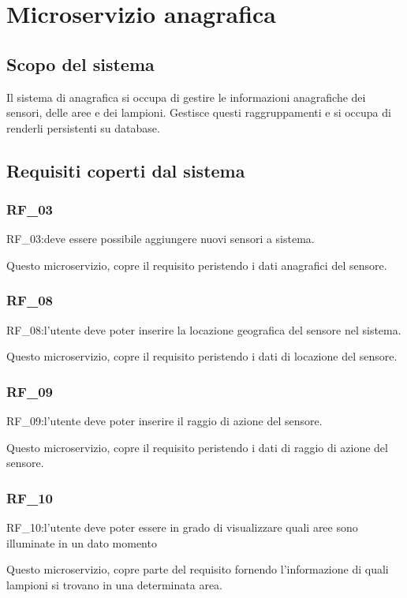 \chapter{Microservizio anagrafica}\label{cap:microservizio-anagrafica}

\section{Scopo del sistema}

Il sistema di anagrafica si occupa di gestire le informazioni anagrafiche dei sensori, delle aree e dei lampioni. Gestisce questi raggruppamenti e si occupa di renderli persistenti su database.

\section{Requisiti coperti dal sistema}

\subsection{RF\_03}
RF\_03:deve essere possibile aggiungere nuovi sensori a sistema.

Questo microservizio, copre il requisito peristendo i dati anagrafici del sensore.

\subsection{RF\_08}
RF\_08:l'utente deve poter inserire la locazione geografica del sensore nel sistema.

Questo microservizio, copre il requisito peristendo i dati di locazione del sensore.

\subsection{RF\_09}
RF\_09:l'utente deve poter inserire il raggio di azione del sensore.

Questo microservizio, copre il requisito peristendo i dati di raggio di azione del sensore.

\subsection{RF\_10}
RF\_10:l'utente deve poter essere in grado di visualizzare quali aree sono illuminate in un dato momento

Questo microservizio, copre parte del requisito fornendo l'informazione di quali lampioni si trovano in una determinata area.



